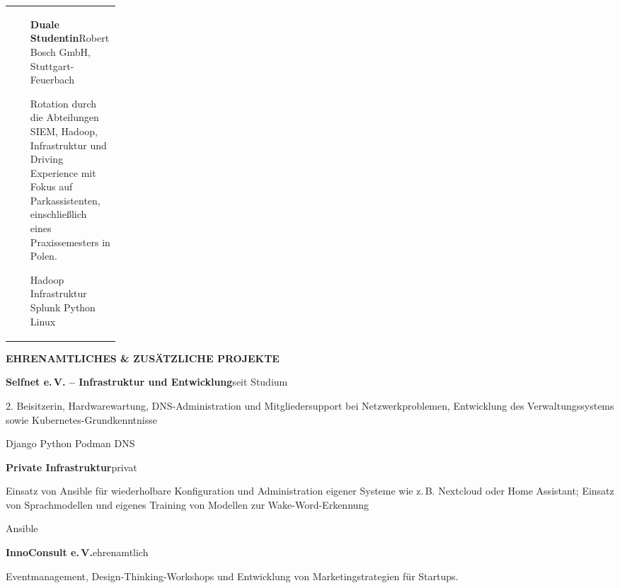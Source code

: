 \documentclass[10pt,a4paper]{article}
\makeatletter
\newcommand{\mainsection}[1]{%
  \vspace{3mm}%
  {\large\bfseries\textcolor{CVPrimary}{\MakeUppercase{#1}}}\par
  \vspace{0.8mm}{\color{CVRule}\rule{\linewidth}{0.6pt}}\vspace{1.2mm}
}
\newcommand{\entry}[4]{%
  \begin{tabularx}{\linewidth}{@{}>{\raggedright\arraybackslash}p{0.18\linewidth}@{\hspace{2.5mm}}X@{}}
    {\small\textcolor{CVMuted}{#1}} &
    {\bfseries #2}\hfill{\small\textcolor{CVMuted}{#3}}\par
    #4
  \end{tabularx}\vspace{1.8mm}
}
\newcommand{\compactentry}[3]{%
  {\bfseries #1}\hfill{\small\textcolor{CVMuted}{#2}}\par
  #3\par\vspace{1.7mm}
}
\newcommand{\tag}[1]{%
  \begingroup
  \setlength{\fboxsep}{1.4pt}%
  \colorbox{CVSoft}{\scriptsize\textcolor{CVPrimary}{#1}}%
  \endgroup\hspace{0.7mm}%
}
\makeatother
\begin{document}
\begin{minipage}[t]{0.68\textwidth}
  \entry{10/2021--09/2024}{Duale Studentin}{Robert Bosch GmbH, Stuttgart-Feuerbach}{
    Rotation durch die Abteilungen SIEM, Hadoop, Infrastruktur und Driving Experience mit Fokus auf Parkassistenten, einschließlich eines Praxissemesters in Polen.\par
    \tag{Hadoop}\tag{Infrastruktur}\tag{Splunk}\tag{Python}\tag{Linux}
  }

  \mainsection{Ehrenamtliches \& zusätzliche Projekte}

  \compactentry{Selfnet e.\,V. -- Infrastruktur und Entwicklung}{seit Studium}{
    2. Beisitzerin, Hardwarewartung, DNS-Administration und Mitgliedersupport bei
    Netzwerkproblemen, Entwicklung des Verwaltungssystems sowie Kubernetes-Grundkenntnisse\par
    \tag{Django}\tag{Python}\tag{Podman}\tag{DNS}
  }

  \compactentry{Private Infrastruktur}{privat}{
    Einsatz von Ansible für wiederholbare Konfiguration und Administration eigener Systeme wie z.\,B. Nextcloud oder Home Assistant; Einsatz von Sprachmodellen und eigenes Training von Modellen zur Wake-Word-Erkennung\par
    \tag{Ansible}
  }

  \compactentry{InnoConsult e.\,V.}{ehrenamtlich}{
    Eventmanagement, Design-Thinking-Workshops und Entwicklung von Marketingstrategien für Startups.
  }
\end{minipage}
\end{document}
